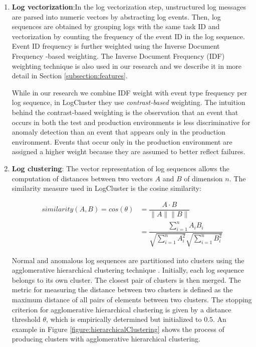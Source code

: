\begin{enumerate}
    \item \textbf{Log vectorization}:In the log vectorization step, unstructured log messages are parsed into numeric vectors by abstracting log events. Then, log sequences are obtained by grouping logs with the same task ID and vectorization by counting the frequency of the event ID in the log sequence. Event ID frequency is further weighted using the Inverse Document Frequency -based weighting. The Inverse Document Frequency (IDF) weighting technique is also used in our research and we describe it in more detail in Section \ref{subsection:features}.
    
    While in our research we combine IDF weight with event type frequency per log sequence, in LogCluster they use \textit{contrast-based} weighting. The intuition behind the contrast-based weighting is the observation that an event that occurs in both the test and production environments is less discriminative for anomaly detection than an event that appears only in the production environment. Events that occur only in the production environment are assigned a higher weight because they are assumed to better reflect failures.
    
    \item \textbf{Log clustering}: The vector representation of log sequences allows the computation of distances between two vectors $A$ and $B$ of dimension $n$. The similarity measure used in LogCluster is the cosine similarity:

    \begin{align*}
        similarity(A, B) = cos(\theta) &= \dfrac{A \cdot B}{\|A \| \|B\|} \\
        &= \dfrac{\sum_{i=1}^n A_i B_i}{\sqrt{\sum_{i=1}^n A_i^2} \sqrt{\sum_{i=1}^n B_i^2}}
    \end{align*}
    
    Normal and anomalous log sequences are partitioned into clusters using the agglomerative hierarchical clustering technique \cite{ahc1969}. Initially, each log sequence belongs to its own cluster. The closest pair of clusters is then merged. The metric for measuring the distance between two clusters is defined as the maximum distance of all pairs of elements between two clusters. The stopping criterion for agglomerative hierarchical clustering is given by a distance threshold $\theta$, which is empirically determined but initialized to $0.5$. An example in Figure \ref{figure:hierarchicalClustering} shows the process of producing clusters with agglomerative hierarchical clustering.
    

\end{enumerate}
